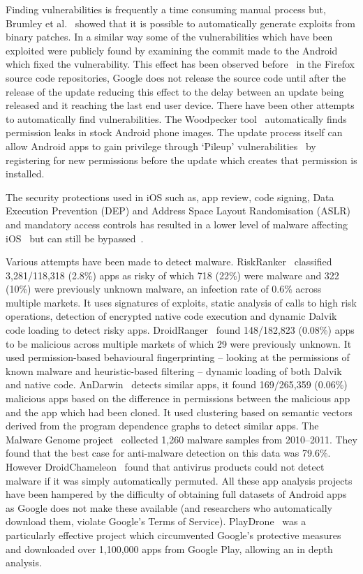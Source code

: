 \documentclass[conference,a4paper,twoside]{IEEEtran}
\let\OldTodo\todo
\renewcommand{\todo}{\OldTodo[inline]}
\newcommand{\todolater}[1]{}%
\begin{document}
Finding vulnerabilities is frequently a time consuming manual process but, Brumley et al.~\cite{Brumley2008} showed that it is possible to automatically generate exploits from binary patches.
In a similar way some of the vulnerabilities\todolater{which?} which have been exploited were publicly found by examining the commit made to the Android which fixed the vulnerability.
This effect has been observed before~\cite{Barth2011} in the Firefox source code repositories, Google does not release the source code until after the release of the update reducing this effect to the delay between an update being released and it reaching the last end user device.
There have been other attempts to automatically find vulnerabilities.
The Woodpecker tool~\cite{Grace2012} automatically finds permission leaks in stock Android phone images.
The update process itself can allow Android apps to gain privilege through `Pileup' vulnerabilities~\cite{Xing2014} by registering for new permissions before the update which creates that permission is installed.

The security protections used in iOS such as, app review, code signing, Data Execution Prevention (DEP) and Address Space Layout Randomisation (ASLR) and mandatory access controls has resulted in a lower level of malware affecting iOS~\cite{Felt2011} but can still be bypassed~\cite{Wang2013a}.

Various attempts have been made to detect malware.
RiskRanker~\cite{Grace2012a} classified 3,281/118,318 (2.8\%) apps as risky of which 718 (22\%) were malware and 322 (10\%) were previously unknown malware, an infection rate of 0.6\% across multiple markets.
It uses signatures of exploits, static analysis of calls to high risk operations, detection of encrypted native code execution and dynamic Dalvik code loading to detect risky apps.
DroidRanger~\cite{Zhou2012a} found 148/182,823 (0.08\%) apps to be malicious across multiple markets of which 29 were previously unknown.
It used permission-based behavioural fingerprinting -- looking at the permissions of known malware and heuristic-based filtering -- dynamic loading of both Dalvik and native code.
AnDarwin~\cite{Crussell2013} detects similar apps, it found 169/265,359 (0.06\%) malicious apps based on the difference in permissions between the malicious app and the app which had been cloned.
It used clustering based on semantic vectors derived from the program dependence graphs to detect similar apps.
The Malware Genome project~\cite{Zhou2012b} collected 1,260 malware samples from 2010--2011.
They found that the best case for anti-malware detection on this data was 79.6\%.
However DroidChameleon~\cite{Rastogi2013} found that antivirus products could not detect malware if it was simply automatically permuted.
All these app analysis projects have been hampered by the difficulty of obtaining full datasets of Android apps as Google does not make these available (and researchers who automatically download them, violate Google's Terms of Service).
PlayDrone~\cite{Viennot2014} was a particularly effective project which circumvented Google's protective measures and downloaded over 1,100,000 apps from Google Play, allowing an in depth analysis.
\end{document}
